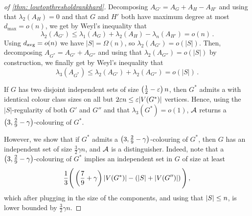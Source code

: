\begin{proof}[of \cref{thm: lowtopthresholdrankhard}]
    Decomposing $A_{G'}=A_G+A_H-A_{H'}$ and using that $\lambda_2(A_H) = 0$ and that $G$ and $H'$ both have maximum degree at most $d_{\max} = o(n)$, we get by  Weyl's inequality that
    \[\lambda_2(A_{G'}) \leq \lambda_1(A_G)+\lambda_2(A_H)-\lambda_n(A_{H'}) = o(n)\,.\]
    Using $d_{\operatorname{avg}}=o(n)$ we have $|S| = \Omega(n)$, so $\lambda_2(A_{G'}) = o(|S|)$. Then, decomposing $A_{G^*}=A_{G'}+A_{G''}$ and using that $\lambda_2(A_{G''})=o(|S|)$ by construction, we finally get by Weyl's inequality that
    \[\lambda_3(A_{G^*}) \leq \lambda_2(A_{G'})+\lambda_2(A_{G''}) =o(|S|)\,.\]

    If $G$ has two disjoint independent sets of size $\left(\frac{1}{2}-\varepsilon\right)n$, then $G^*$ admits a \tcl with identical colour class sizes on all but $2\varepsilon n \leq \varepsilon |V(G^*)|$ vertices.
    Hence, using the $|S|$-regularity of both $G'$ and $G''$ and that $\lambda_3(G^*)=o(1)$, $\mathcal{A}$ returns a $\left(3, \frac{2}{9}-\gamma\right)$-colouring of $G^*$.

    However, we show that if $G^*$ admits a $\left(3, \frac{2}{9}-\gamma\right)$-colouring of $G^*$, then $G$ has an independent set of size $\frac{3}{2}\gamma n$, and $\mathcal{A}$ is a distinguisher.
    Indeed, note that a $\left(3, \frac{2}{9}-\gamma\right)$-colouring of $G^*$ implies an independent set in $G$ of size at least
    $$\frac{1}{3}\Bigg(\left(\frac{7}{9}+\gamma\right)\left\lvert V(G^*)\right\rvert-\left(\left\lvert S\right\rvert+|V(G'')|\right)\Bigg)\,,$$
    which after plugging in the size of the components, and using that $\left\lvert S\right\rvert\leq n$, is lower bounded by $\frac{3}{2} \gamma n$.
\end{proof}
